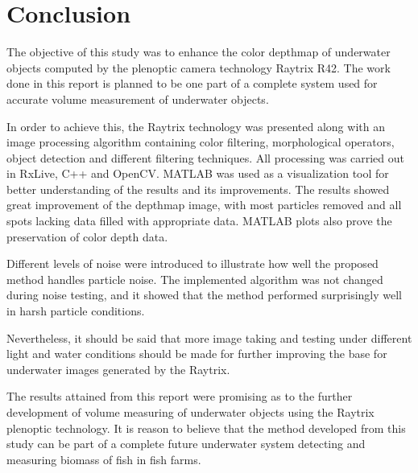 \section{Conclusion}\label{conclusion}

The objective of this study was to enhance the color depthmap of underwater objects computed by the plenoptic camera technology Raytrix R42. The work done in this report is planned to be one part of a complete system used for accurate volume measurement of underwater objects. 

In order to achieve this, the Raytrix technology was presented along with an image processing algorithm containing color filtering, morphological operators, object detection and different filtering techniques. All processing was carried out in RxLive, C++ and OpenCV. MATLAB was used as a visualization tool for better understanding of the results and its improvements. The results showed great improvement of the depthmap image, with most particles removed and all spots lacking data filled with appropriate data. MATLAB plots also prove the preservation of color depth data.

Different levels of noise were introduced to illustrate how well the proposed method handles particle noise. The implemented algorithm was not changed during noise testing, and it showed that the method performed surprisingly well in harsh particle conditions. 

Nevertheless, it should be said that more image taking and testing under different light and water conditions should be made for further improving the base for underwater images generated by the Raytrix.

The results attained from this report were promising as to the further development of volume measuring of underwater objects using the Raytrix plenoptic technology. It is reason to believe that the method developed from this study can be part of a complete future underwater system detecting and measuring biomass of fish in fish farms. 

